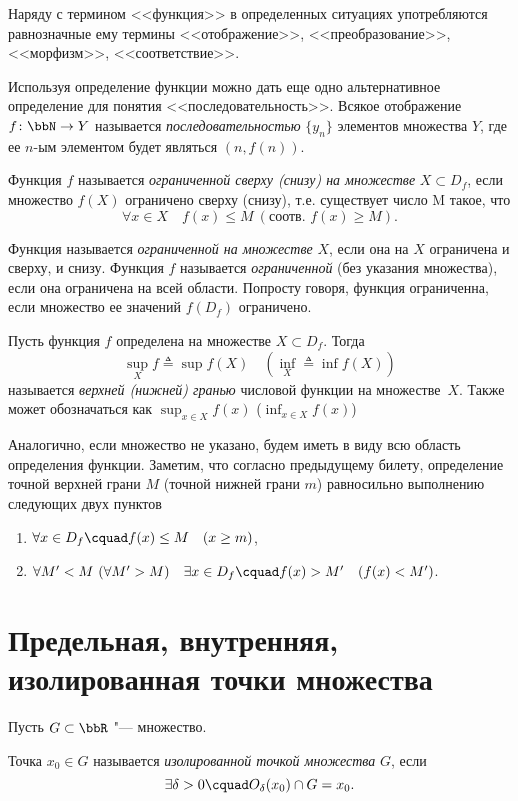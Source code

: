 Наряду с термином <<функция>> в определенных ситуациях употребляются равнозначные ему термины <<отображение>>, <<преобразование>>, <<морфизм>>, <<соответствие>>.
\begin{notion}
Используя определение функции можно дать еще одно альтернативное определение для понятия <<последовательность>>. Всякое отображение $f\colon \bbN \to Y$  называется \textit{последовательностью} $\{y_n\}$ элементов множества $Y$, где ее $n$-ым элементом будет являться $(n,f(n))$.
\end{notion} 

\begin{defn}
Функция $f$ называется \textit{ограниченной сверху (снизу) на множестве} $X\subset D_f$, если множество $f(X)$ ограничено сверху (снизу), т.е. существует число M такое, что
$$
\forall x \in X \quad f(x) \le M \ (\text{соотв. } f(x)\ge M).
$$
\end{defn}

Функция называется \textit{ограниченной на множестве} $X$, если она на $X$ ограничена и сверху, и снизу. Функция $f$ называется \textit{ограниченной} (без указания множества), если она ограничена на всей области. Попросту говоря, функция ограниченна, если множество ее значений $f(D_f)$ ограничено.

\begin{defn}
Пусть функция $f$ определена на множестве $X\subset D_f$. Тогда 
$$
\sup_{X}\limits f \triangleq \sup f(X)\quad (\inf_{X}\limits \triangleq \inf f(X))
$$ называется \textit{верхней (нижней) гранью} числовой функции на множестве~$X$. Также может обозначаться как $\sup_{x\in X}\limits f(x)$ ($\inf_{x\in X}\limits f(x)$)
\end{defn}

Аналогично, если множество не указано, будем иметь в виду всю область определения функции. Заметим, что согласно предыдущему билету, определение точной верхней грани $M$ (точной нижней грани $m$) равносильно выполнению следующих двух пунктов 
\begin{enumerate}
\item
$\forall x \in D_f\cquad f(x) \le M \quad (x\ge m)$,
\item
$\forall M' < M \ (\forall M' > M)\quad \exists x\in D_f\cquad f(x) > M' \quad (f(x) < M')$.
\end{enumerate}

\section{Предельная, внутренняя, изолированная точки множества}
Пусть $G \subset \bbR$ "--- множество.
\begin{defn}
Точка $x_0 \in G$ называется \textit{изолированной точкой множества} $G$, если $$\exists \delta >0\cquad  O_\delta(x_0) \cap G = x_0.$$
\end{defn}

